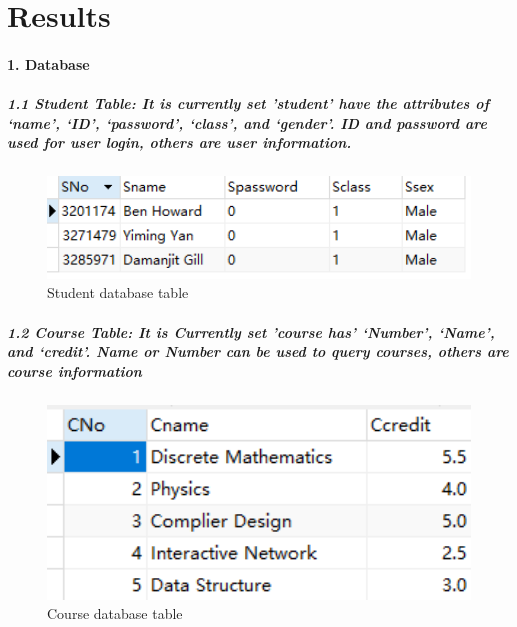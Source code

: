 \documentclass[12pt]{article}
\begin{document}
\section{Results}%


\paragraph{1. Database}

\subparagraph{1.1 Student Table: It is currently set 'student' have the attributes of ‘name’, ‘ID’, ‘password’, ‘class’, and ‘gender’. ID and password are used for user login, others are user information.}

\begin{figure}[h]
\centering
\includegraphics[width=14cm]{./db_student.png}
Student database table
\end{figure}

\subparagraph{1.2 Course Table: It is Currently set 'course has' ‘Number’, ‘Name’, and ‘credit’. Name or Number can be used to query courses, others are course information}

\begin{figure}[h]
\centering
\includegraphics[width=14cm]{./db_course.png}
Course database table
\end{figure}
\end{document}
